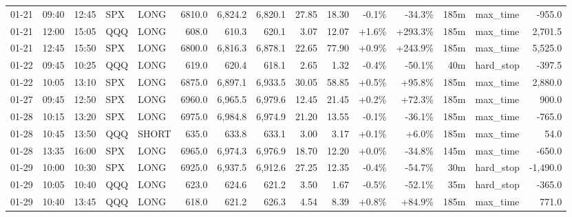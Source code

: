 \documentclass[11pt,a4paper,twoside]{article}
\begin{document}
\begin{landscape}
\begin{center}
\begin{longtable}{>{\color{txtmain}}l l l l l r r r r r r r r >{\color{txtmain}}l r}
01-21 & 09:40 & 12:45 & SPX & LONG & 6810.0 & 6,824.2 & 6,820.1 & 27.85 & 18.30 & \textcolor{lossred}{-0.1\%} & \textcolor{lossred}{-34.3\%} & 185m & max\_time & \textcolor{lossred}{-955.0} \\
01-21 & 12:00 & 15:05 & QQQ & LONG & 608.0 & 610.3 & 620.1 & 3.07 & 12.07 & \textcolor{wingreen}{+1.6\%} & \textcolor{wingreen}{+293.3\%} & 185m & max\_time & \textcolor{wingreen}{2,701.5} \\
01-21 & 12:45 & 15:50 & SPX & LONG & 6800.0 & 6,816.3 & 6,878.1 & 22.65 & 77.90 & \textcolor{wingreen}{+0.9\%} & \textcolor{wingreen}{+243.9\%} & 185m & max\_time & \textcolor{wingreen}{5,525.0} \\
01-22 & 09:45 & 10:25 & QQQ & LONG & 619.0 & 620.4 & 618.1 & 2.65 & 1.32 & \textcolor{lossred}{-0.4\%} & \textcolor{lossred}{-50.1\%} & 40m & hard\_stop & \textcolor{lossred}{-397.5} \\
01-22 & 10:05 & 13:10 & SPX & LONG & 6875.0 & 6,897.1 & 6,933.5 & 30.05 & 58.85 & \textcolor{wingreen}{+0.5\%} & \textcolor{wingreen}{+95.8\%} & 185m & max\_time & \textcolor{wingreen}{2,880.0} \\
01-27 & 09:45 & 12:50 & SPX & LONG & 6960.0 & 6,965.5 & 6,979.6 & 12.45 & 21.45 & \textcolor{wingreen}{+0.2\%} & \textcolor{wingreen}{+72.3\%} & 185m & max\_time & \textcolor{wingreen}{900.0} \\
01-28 & 10:15 & 13:20 & SPX & LONG & 6975.0 & 6,984.8 & 6,974.9 & 21.20 & 13.55 & \textcolor{lossred}{-0.1\%} & \textcolor{lossred}{-36.1\%} & 185m & max\_time & \textcolor{lossred}{-765.0} \\
01-28 & 10:45 & 13:50 & QQQ & SHORT & 635.0 & 633.8 & 633.1 & 3.00 & 3.17 & \textcolor{wingreen}{+0.1\%} & \textcolor{wingreen}{+6.0\%} & 185m & max\_time & \textcolor{wingreen}{54.0} \\
01-28 & 13:35 & 16:00 & SPX & LONG & 6965.0 & 6,974.3 & 6,976.9 & 18.70 & 12.20 & \textcolor{wingreen}{+0.0\%} & \textcolor{lossred}{-34.8\%} & 145m & max\_time & \textcolor{lossred}{-650.0} \\
01-29 & 10:00 & 10:30 & SPX & LONG & 6925.0 & 6,937.5 & 6,912.6 & 27.25 & 12.35 & \textcolor{lossred}{-0.4\%} & \textcolor{lossred}{-54.7\%} & 30m & hard\_stop & \textcolor{lossred}{-1,490.0} \\
01-29 & 10:05 & 10:40 & QQQ & LONG & 623.0 & 624.6 & 621.2 & 3.50 & 1.67 & \textcolor{lossred}{-0.5\%} & \textcolor{lossred}{-52.1\%} & 35m & hard\_stop & \textcolor{lossred}{-365.0} \\
01-29 & 10:40 & 13:45 & QQQ & LONG & 618.0 & 621.2 & 626.3 & 4.54 & 8.39 & \textcolor{wingreen}{+0.8\%} & \textcolor{wingreen}{+84.9\%} & 185m & max\_time & \textcolor{wingreen}{771.0} \\

\end{longtable}
\end{center}
\end{landscape}
\end{document}
